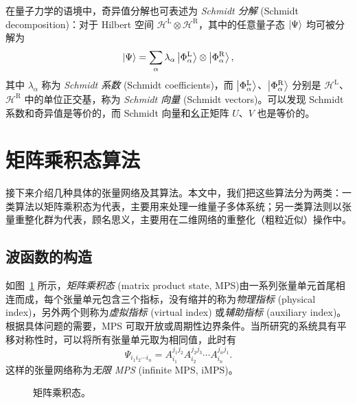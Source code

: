 在量子力学的语境中，奇异值分解也可表述为 \emph{Schmidt 分解} (Schmidt decomposition)：对于 Hilbert 空间 $\mathcal{H}^{\text{L}}\otimes\mathcal{H}^{\text{R}}$，其中的任意量子态 $\ket{\Psi}$ 均可被分解为
\begin{equation}
  \ket{\Psi} = \sum_\alpha \lambda_\alpha \ket{\Phi^{\text{L}}_\alpha} \otimes \ket{\Phi^{\text{R}}_\alpha},
  \label{eq:schmidt-decomposition}
\end{equation}
其中 $\lambda_\alpha$ 称为 \emph{Schmidt 系数} (Schmidt coefficients)，而 $\ket{\Phi^{\text{L}}_\alpha}$、$\ket{\Phi^{\text{R}}_\alpha}$ 分别是 $\mathcal{H}^{\text{L}}$、$\mathcal{H}^{\text{R}}$ 中的单位正交基，称为 \emph{Schmidt 向量} (Schmidt vectors)。可以发现 Schmidt 系数和奇异值是等价的，而 Schmidt 向量和幺正矩阵 $U$、$V$ 也是等价的。

\section{矩阵乘积态算法}

接下来介绍几种具体的张量网络及其算法。本文中，我们把这些算法分为两类：一类算法以矩阵乘积态为代表，主要用来处理一维量子多体系统；另一类算法则以张量重整化群为代表，顾名思义，主要用在二维网络的重整化（粗粒近似）操作中。

\subsection{波函数的构造}
\label{subsec:mps-construction}

如图~\ref{fig:mps} 所示，\emph{矩阵乘积态} (matrix product state, MPS)\cite{perez2007matrix,verstraete2008matrix,orus2014practical,cirac2021matrix}由一系列张量单元首尾相连而成，每个张量单元包含三个指标，没有缩并的称为\emph{物理指标} (physical index)，另外两个则称为\emph{虚拟指标} (virtual index) 或\emph{辅助指标} (auxiliary index)。根据具体问题的需要，MPS 可取开放或周期性边界条件。当所研究的系统具有平移对称性时，可以将所有张量单元取为相同值，此时有
\begin{equation}
  \Psi_{i_1 i_2 \cdots i_n} = A^{j_1 j_2}_{i_1} A^{j_2 j_3}_{i_2} \cdots A^{j_n j_1}_{i_n}.
\end{equation}
这样的张量网络称为\emph{无限 MPS} (infinite MPS, iMPS)。

\begin{figure}[htb]
  \centering
   \qquad
  \caption[矩阵乘积态]{矩阵乘积态。}
  \label{fig:mps}
\end{figure}

